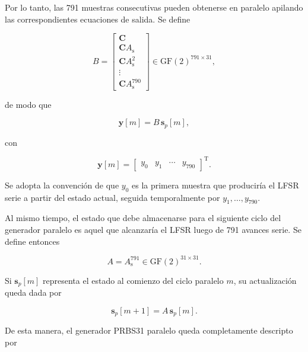 \documentclass[10pt,a4paper]{article}
\begin{document}
Por lo tanto, las 791 muestras consecutivas pueden obtenerse en paralelo
apilando las correspondientes ecuaciones de salida. Se define

\begin{equation}
    B=
    \begin{bmatrix}
        \mathbf{C} \\
        \mathbf{C}A_{\mathrm{s}} \\
        \mathbf{C}A_{\mathrm{s}}^2 \\
        \vdots \\
        \mathbf{C}A_{\mathrm{s}}^{790}
    \end{bmatrix}
    \in\mathrm{GF}(2)^{791\times31},
    \label{eq:prbs-matriz-salida}
\end{equation}

de modo que

\begin{equation}
    \mathbf{y}[m]
    =
    B\,\mathbf{s}_{p}[m],
\end{equation}

con

\begin{equation}
    \mathbf{y}[m]
    =
    \begin{bmatrix}
        y_0 & y_1 & \cdots & y_{790}
    \end{bmatrix}^{\mathrm{T}}.
\end{equation}

Se adopta la convención de que $y_0$ es la primera muestra que produciría el
LFSR serie a partir del estado actual, seguida temporalmente por
$y_1,\ldots,y_{790}$.

Al mismo tiempo, el estado que debe almacenarse para el siguiente ciclo del
generador paralelo es aquel que alcanzaría el LFSR luego de 791 avances serie.
Se define entonces

\begin{equation}
    A
    =
    A_{\mathrm{s}}^{791}
    \in\mathrm{GF}(2)^{31\times31}.
    \label{eq:prbs-matriz-transicion-paralela}
\end{equation}

Si $\mathbf{s}_{p}[m]$ representa el estado al comienzo del ciclo paralelo
$m$, su actualización queda dada por

\begin{equation}
    \mathbf{s}_{p}[m+1]
    =
    A\,\mathbf{s}_{p}[m].
\end{equation}

De esta manera, el generador PRBS31 paralelo queda completamente descripto
por
\end{document}

